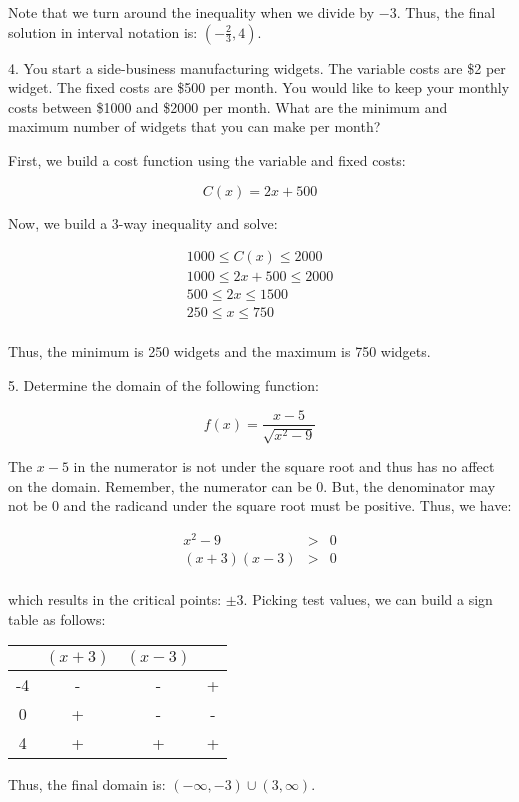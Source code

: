 \documentclass[letterpaper, 12pt]{article}
\begin{document}
Note that we turn around the inequality when we divide by $-3$. Thus, the
final solution in interval notation is: $(-\frac{2}{3},4)$.

\bigskip

4. You start a side-business manufacturing widgets. The variable costs are \$2
per widget. The fixed costs are \$500 per month. You would like to keep your
monthly costs between \$1000 and \$2000 per month. What are the minimum and
maximum number of widgets that you can make per month?

First, we build a cost function using the variable and fixed costs:

\[C(x)=2x+500\]

Now, we build a 3-way inequality and solve:

\begin{eqnarray*}
1000 \le C(x) \le 2000 \\
1000 \le 2x+500 \le 2000 \\
500 \le 2x \le 1500 \\
250 \le x \le 750 \\
\end{eqnarray*}

Thus, the minimum is 250 widgets and the maximum is 750 widgets.

\bigskip

5. Determine the domain of the following function:

\[f(x)=\frac{x-5}{\sqrt{x^2-9}}\]

The $x-5$ in the numerator is not under the square root and thus has no affect
on the domain. Remember, the numerator can be 0. But, the denominator may not
be 0 and the radicand under the square root must be positive. Thus, we have:

\begin{eqnarray*}
x^2-9 &>& 0 \\
(x+3)(x-3) &>& 0 \\
\end{eqnarray*}

which results in the critical points: $\pm3$. Picking test values, we can
build a sign table as follows:

\bigskip

\begin{tabular}{|c|c|c|c|}
\hline
 & $(x+3)$ & $(x-3)$ & \\
\hline
-4 & - & - & + \\
\hline
0 & + & - & - \\
\hline
4 & + & + & + \\
\hline
\end{tabular}

\bigskip

Thus, the final domain is: $(-\infty,-3)\cup(3,\infty)$.
\end{document}
